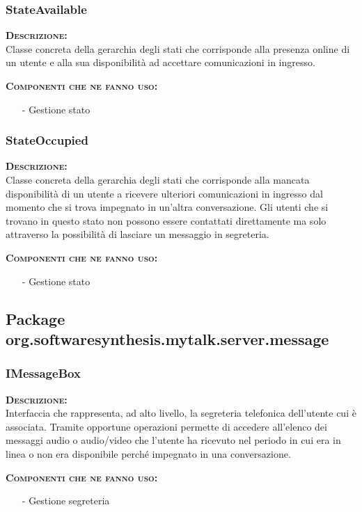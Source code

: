 \subsubsection{StateAvailable}
\begin{description}
	\item{\scshape\bfseries Descrizione:}\\
Classe concreta della gerarchia degli stati che corrisponde alla presenza online di un utente e alla sua disponibilità ad accettare comunicazioni in ingresso.
	\item{\scshape\bfseries Componenti che ne fanno uso:}
    \begin{itemize}[noitemsep,nolistsep]
      \item[-] Gestione stato
    \end{itemize}
\end{description}

\subsubsection{StateOccupied}
\begin{description}
	\item{\scshape\bfseries Descrizione:}\\
Classe concreta della gerarchia degli stati che corrisponde alla mancata disponibilità di un utente a ricevere ulteriori comunicazioni in ingresso dal momento che si trova impegnato in un'altra conversazione. Gli utenti che si trovano in questo stato non possono essere contattati direttamente ma solo attraverso la possibilità di lasciare un messaggio in segreteria.
	\item{\scshape\bfseries Componenti che ne fanno uso:}
	\begin{itemize}[noitemsep,nolistsep]
	  \item[-] Gestione stato
	\end{itemize}
\end{description}

\subsection{Package org.softwaresynthesis.mytalk.server.message}
\subsubsection{IMessageBox}
\begin{description}
	\item{\scshape\bfseries Descrizione:}\\
Interfaccia che rappresenta, ad alto livello, la segreteria telefonica dell'utente cui è associata. Tramite opportune operazioni permette di accedere all'elenco dei messaggi audio o audio/video che l'utente ha ricevuto nel periodo in cui era in linea o non era disponibile perché impegnato in una conversazione.
	\item{\scshape\bfseries Componenti che ne fanno uso:}
	\begin{itemize}
	  \item[-] Gestione segreteria
	\end{itemize}
\end{description}


